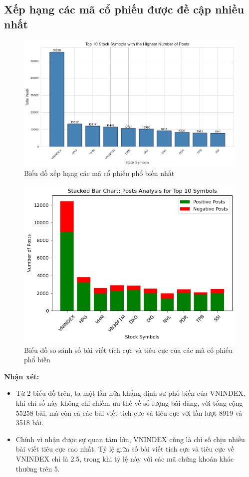 \subsection{Xếp hạng các mã cổ phiếu được đề cập nhiều nhất}

\begin{figure}[H]
    \centering
    \includegraphics[width=0.9\linewidth]{images/C2_pic38.png}
    \vspace{-1em}
    \caption{Biểu đồ xếp hạng các mã cổ phiếu phổ biến nhất}
    \label{fig:2.14}
\end{figure}
\vspace{-1em}
\begin{figure}[H]
    \centering
    \includegraphics[width=0.65\linewidth]{images/C2_pic37.png}
    \vspace{-1em}
    \caption{Biểu đồ so sánh số bài viết tích cực và tiêu cực của các mã cổ phiếu phổ biến}
    \label{fig:2.15}
\end{figure}

\textbf{Nhận xét:}

\begin{itemize}
    \item Từ 2 biểu đồ trên, ta một lần nữa khẳng định sự phổ biến của VNINDEX, khi chỉ số này không chỉ chiếm ưu thế về số lượng bài đăng, với tổng cộng 55258 bài, mà còn cả các bài viết tich cực và tiêu cực với lần lượt 8919 và 3518 bài.
    \item Chính vì nhận được sự quan tâm lớn, VNINDEX cũng là chỉ số chịu nhiều bài viết tiêu cực cao nhất. Tỷ lệ giữa số bài viết tích cực và tiêu cực về VNINDEX chỉ là 2.5, trong khi tỷ lệ này với các mã chứng khoán khác thường trên 5.
\end{itemize}

